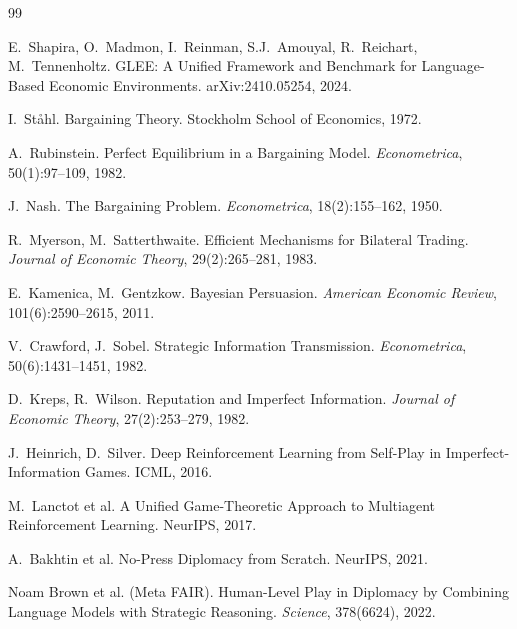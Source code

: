 \documentclass[11pt]{article}
\begin{document}

\begin{thebibliography}{99}

E.~Shapira, O.~Madmon, I.~Reinman, S.J.~Amouyal, R.~Reichart, M.~Tennenholtz.
\newblock GLEE: A Unified Framework and Benchmark for Language-Based Economic Environments.
\newblock arXiv:2410.05254, 2024.

I.~St{\aa}hl. \newblock Bargaining Theory. Stockholm School of Economics, 1972.

A.~Rubinstein. \newblock Perfect Equilibrium in a Bargaining Model.
\newblock \emph{Econometrica}, 50(1):97--109, 1982.

J.~Nash. \newblock The Bargaining Problem. \emph{Econometrica}, 18(2):155--162, 1950.

R.~Myerson, M.~Satterthwaite. \newblock Efficient Mechanisms for Bilateral Trading.
\newblock \emph{Journal of Economic Theory}, 29(2):265--281, 1983.

E.~Kamenica, M.~Gentzkow. \newblock Bayesian Persuasion.
\newblock \emph{American Economic Review}, 101(6):2590--2615, 2011.

V.~Crawford, J.~Sobel. \newblock Strategic Information Transmission.
\newblock \emph{Econometrica}, 50(6):1431--1451, 1982.

D.~Kreps, R.~Wilson. \newblock Reputation and Imperfect Information.
\newblock \emph{Journal of Economic Theory}, 27(2):253--279, 1982.

J.~Heinrich, D.~Silver. \newblock Deep Reinforcement Learning from Self-Play in Imperfect-Information Games.
\newblock ICML, 2016.

M.~Lanctot et al. \newblock A Unified Game-Theoretic Approach to Multiagent Reinforcement Learning.
\newblock NeurIPS, 2017.

A.~Bakhtin et al. \newblock No-Press Diplomacy from Scratch.
\newblock NeurIPS, 2021.

Noam Brown et al. (Meta FAIR).
\newblock Human-Level Play in Diplomacy by Combining Language Models with Strategic Reasoning.
\newblock \emph{Science}, 378(6624), 2022.


\end{thebibliography}
\end{document}
